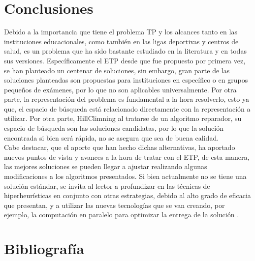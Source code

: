 \section{Conclusiones}
\label{Conclusiones}
Debido a la importancia que tiene el problema TP y los alcances tanto en las instituciones educacionales, como también en las ligas deportivas y centros de salud, es un problema que ha sido bastante estudiado en la literatura y en todas sus versiones. Específicamente el ETP desde que fue propuesto por primera vez, se han planteado un centenar de soluciones, sin embargo, gran parte de las soluciones planteadas son propuestas para instituciones en específico o en grupos pequeños de exámenes, por lo que no son aplicables universalmente. Por otra parte, la representación del problema es fundamental a la hora resolverlo, esto ya que, el espacio de búsqueda está relacionado directamente con la representación a utilizar. Por otra parte, HillClimning al tratarse de un algoritmo reparador, su espacio de búsqueda son las soluciones candidatas, por lo que la solución encontrada si bien será rápida, no se asegura que sea de buena calidad.\\
Cabe destacar, que el aporte que han hecho dichas alternativas, ha aportado nuevos puntos de vista y avances a la hora de tratar con el ETP, de esta manera, las mejores soluciones se pueden llegar a ajustar realizando algunas modificaciones a los algoritmos presentados. Si bien actualmente no se tiene una solución estándar, se invita al lector a profundizar en las técnicas de hiperheurísticas en conjunto con otras estrategias, debido al alto grado de eficacia que presentan, y a utilizar las nuevas tecnologías que se van creando, por ejemplo, la computación en paralelo para optimizar la entrega de la solución \cite{Cita25}.


\section{Bibliograf\'ia}
\label{Bibliografía}




 


 
